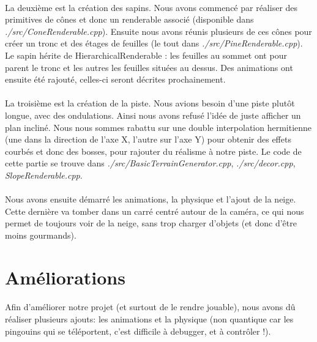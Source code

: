 \documentclass[11pt]{article}
\begin{document}
    \paragraph{}
    La deuxième est la création des sapins.
    Nous avons commencé par réaliser des primitives de cônes et donc un renderable associé (disponible dans \textit{./src/ConeRenderable.cpp}).
    Ensuite nous avons réunis plusieurs de ces cônes pour créer un tronc et des étages de feuilles (le tout dans \textit{./src/PineRenderable.cpp}).
    Le sapin hérite de HierarchicalRenderable : les feuilles au sommet ont pour parent le tronc et les autres les feuilles situées au dessus.
    Des animations ont ensuite été rajouté, celles-ci seront décrites prochainement.


    \paragraph{}
    La troisième est la création de la piste.
    Nous avions besoin d'une piste plutôt longue, avec des ondulations. Ainsi nous avons refusé l'idée de juste afficher un plan incliné.
    Nous nous sommes rabattu sur une double interpolation hermitienne (une dans la direction de l'axe X, l'autre sur l'axe Y) pour obtenir des effets courbés et donc des bosses, pour rajouter du réalisme à notre piste.
    Le code de cette partie se trouve dans \textit{./src/BasicTerrainGenerator.cpp}, \textit{./src/decor.cpp}, \textit{SlopeRenderable.cpp}.
    

    \paragraph{}
    Nous avons ensuite démarré les animations, la physique et l'ajout de la neige.
    Cette dernière va tomber dans un carré centré autour de la caméra, ce qui nous permet de toujours voir de la neige, sans trop charger d'objets (et donc d'être moins gourmands).

    \newpage
    \section{Améliorations}

    \paragraph{}
    Afin d'améliorer notre projet (et surtout de le rendre jouable), nous avons dû réaliser plusieurs ajouts: les animations et la physique (non quantique car les pingouins qui se téléportent, c'est difficile à debugger, et à contrôler !).
\end{document}

